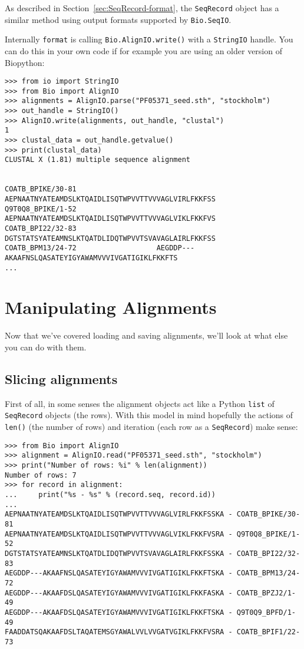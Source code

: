 As described in Section~\ref{sec:SeqRecord-format}, the \verb|SeqRecord| object has a similar method using output formats supported by \verb|Bio.SeqIO|.

Internally \verb|format| is calling \verb|Bio.AlignIO.write()| with a \verb|StringIO| handle.  You can do this in your own code if for example you are using an
older version of Biopython:

\begin{verbatim}
>>> from io import StringIO
>>> from Bio import AlignIO
>>> alignments = AlignIO.parse("PF05371_seed.sth", "stockholm")
>>> out_handle = StringIO()
>>> AlignIO.write(alignments, out_handle, "clustal")
1
>>> clustal_data = out_handle.getvalue()
>>> print(clustal_data)
CLUSTAL X (1.81) multiple sequence alignment


COATB_BPIKE/30-81                   AEPNAATNYATEAMDSLKTQAIDLISQTWPVVTTVVVAGLVIRLFKKFSS
Q9T0Q8_BPIKE/1-52                   AEPNAATNYATEAMDSLKTQAIDLISQTWPVVTTVVVAGLVIKLFKKFVS
COATB_BPI22/32-83                   DGTSTATSYATEAMNSLKTQATDLIDQTWPVVTSVAVAGLAIRLFKKFSS
COATB_BPM13/24-72                   AEGDDP---AKAAFNSLQASATEYIGYAWAMVVVIVGATIGIKLFKKFTS
...
\end{verbatim}

\section{Manipulating Alignments}
\label{sec:manipulating-alignments}

Now that we've covered loading and saving alignments, we'll look at what else you can do
with them.

\subsection{Slicing alignments}
First of all, in some senses the alignment objects act like a Python \verb|list| of
\verb|SeqRecord| objects (the rows). With this model in mind hopefully the actions
of \verb|len()| (the number of rows) and iteration (each row as a \verb|SeqRecord|)
make sense:

\begin{verbatim}
>>> from Bio import AlignIO
>>> alignment = AlignIO.read("PF05371_seed.sth", "stockholm")
>>> print("Number of rows: %i" % len(alignment))
Number of rows: 7
>>> for record in alignment:
...     print("%s - %s" % (record.seq, record.id))
...
AEPNAATNYATEAMDSLKTQAIDLISQTWPVVTTVVVAGLVIRLFKKFSSKA - COATB_BPIKE/30-81
AEPNAATNYATEAMDSLKTQAIDLISQTWPVVTTVVVAGLVIKLFKKFVSRA - Q9T0Q8_BPIKE/1-52
DGTSTATSYATEAMNSLKTQATDLIDQTWPVVTSVAVAGLAIRLFKKFSSKA - COATB_BPI22/32-83
AEGDDP---AKAAFNSLQASATEYIGYAWAMVVVIVGATIGIKLFKKFTSKA - COATB_BPM13/24-72
AEGDDP---AKAAFDSLQASATEYIGYAWAMVVVIVGATIGIKLFKKFASKA - COATB_BPZJ2/1-49
AEGDDP---AKAAFDSLQASATEYIGYAWAMVVVIVGATIGIKLFKKFTSKA - Q9T0Q9_BPFD/1-49
FAADDATSQAKAAFDSLTAQATEMSGYAWALVVLVVGATVGIKLFKKFVSRA - COATB_BPIF1/22-73
\end{verbatim}

